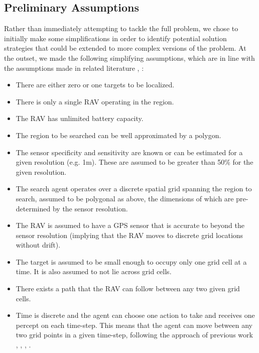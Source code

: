 \subsection{Preliminary Assumptions}\label{subsec:initalAssumptions}

Rather than immediately attempting to tackle the full problem, we chose to initially make some simplifications in order to identify potential solution strategies that could be extended to more complex versions of the problem. At the outset, we made the following simplifying assumptions, which are in line with the assumptions made in related literature \cite{Chung2007ASearch}, \cite{Chung2008Multi-agentFramework}:
\begin{itemize}
    \item There are either zero or one targets to be localized.
    \item There is only a single RAV operating in the region.
    \item The RAV has unlimited battery capacity.
    \item The region to be searched can be well approximated by a polygon.
    \item The sensor specificity and sensitivity are known or can be estimated for a given resolution (e.g. 1m). These are assumed to be greater than 50\% for the given resolution.
    \item The search agent operates over a discrete spatial grid spanning the region to search, assumed to be polygonal as above, the dimensions of which are pre-determined by the sensor resolution.
    \item The RAV is assumed to have a GPS sensor that is accurate to beyond the sensor resolution (implying that the RAV moves to discrete grid locations without drift).
    \item The target is assumed to be small enough to occupy only one grid cell at a time. It is also assumed to not lie across grid cells.
    \item There exists a path that the RAV can follow between any two given grid cells.
    \item Time is discrete and the agent can choose one action to take and receives one percept on each time-step. This means that the agent can move between any two grid points in a given time-step, following the approach of previous work \cite{Chung2007ASearch}, \cite{Chung2008Multi-agentFramework}, \cite{Kriheli2016OptimalInspections}, \cite{Waharte2009CoordinatedUAVs}.
\end{itemize}
